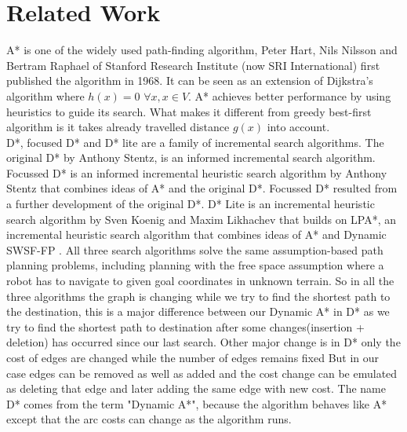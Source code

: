 \documentclass[a4paper]{article}
\begin{document}
\section{Related Work}
A* \cite{A*} is one of the widely used path-finding algorithm, Peter Hart, Nils Nilsson and Bertram Raphael of Stanford Research Institute (now SRI International) first published the algorithm in 1968. It can be seen as an extension of Dijkstra's algorithm where $h(x)=0 $ $\forall x, x \in V$. A* achieves better performance by using heuristics to guide its search. What makes it different from greedy best-first algorithm is it takes already travelled distance $g(x)$ into account.\\
D*\cite{original D*}, focused D*\cite{focused D*} and D* lite\cite{D* Lite} are a family of incremental search algorithms. The original D*\cite{original D*} by Anthony Stentz, is an informed incremental search algorithm. Focussed D*\cite{focused D*} is an informed incremental heuristic search algorithm by Anthony Stentz that combines ideas of A*\cite{A*} and the original D*\cite{original D*}. Focussed D* resulted from a further development of the original D*. D* Lite \cite{D* Lite} is an incremental heuristic search algorithm by Sven Koenig and Maxim Likhachev that builds on LPA*\cite{LPA*}, an incremental heuristic search algorithm that combines ideas of A* and Dynamic SWSF-FP \cite{SPP}. All three search algorithms solve the same assumption-based path planning problems, including planning with the free space assumption\cite{PF} where a robot has to navigate to given goal coordinates in unknown terrain. So in all the three algorithms the graph is changing while we try to find the shortest path to the destination, this is a major difference between our Dynamic A* in D* as we try to find the shortest path to destination after some changes(insertion + deletion) has occurred since our last search. Other major change is in D* only the cost of edges are changed while the number of edges remains fixed But in our case edges can be removed as well as added and the cost change can be emulated as deleting that edge and later adding the same edge with new cost. The name D* comes from the term "Dynamic A*", because the algorithm behaves like A* except that the arc costs can change as the algorithm runs.\\
\end{document}
